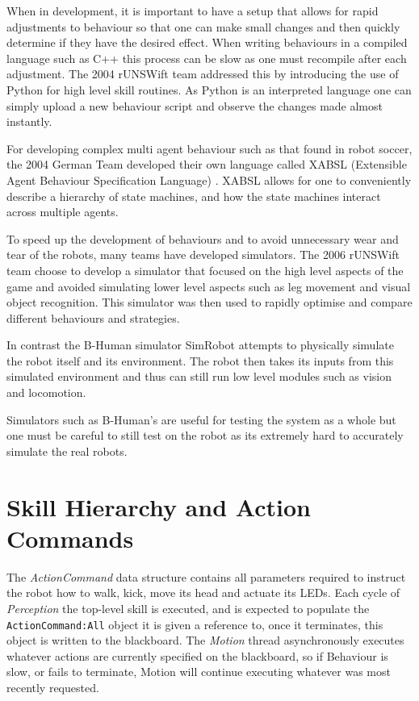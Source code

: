 \documentclass[pdftex,11pt,a4paper]{report}
\begin{document}
When in development, it is important to have a setup that allows for rapid adjustments to behaviour so that one can make small changes and then quickly determine if they have the desired effect. When writing behaviours in a compiled language such as C++ this process can be slow as one must recompile after each adjustment. The 2004 rUNSWift team addressed this by introducing the use of Python for high level skill routines. As Python is an interpreted language one can simply upload a new behaviour script and observe the changes made almost instantly.

For developing complex multi agent behaviour such as that found in robot soccer, the 2004 German Team developed their own language called XABSL (Extensible Agent Behaviour Specification Language) \cite{loetzsch04xabsl}. XABSL allows for one to conveniently describe a hierarchy of state machines, and how the state machines interact across multiple agents.

To speed up the development of behaviours and to avoid unnecessary wear and tear of the robots, many teams have developed simulators. The 2006 rUNSWift team \cite{huangthesis} choose to develop a simulator that focused on the high level aspects of the game and avoided simulating lower level aspects such as leg movement and visual object recognition. This simulator was then used to rapidly optimise and compare different behaviours and strategies. 

In contrast the B-Human simulator SimRobot \cite{thomas09code} attempts to physically simulate the robot itself and its environment. The robot then takes its inputs from this simulated environment and thus can still run low level modules such as vision and locomotion. 

Simulators such as B-Human's are useful for testing the system as a whole but one must be careful to still test on the robot as its extremely hard to accurately simulate the real robots.


\section{Skill Hierarchy and Action Commands}

   The \emph{ActionCommand} data structure contains all parameters required to instruct the robot how to walk, kick, move its head and actuate its LEDs. Each cycle of \emph{Perception} the top-level skill is executed, and is expected to populate the \texttt{ActionCommand:All} object it is given a reference to, once it terminates, this object is written to the blackboard. The \emph{Motion} thread asynchronously executes whatever actions are currently specified on the blackboard, so if Behaviour is slow, or fails to terminate, Motion will continue executing whatever was most recently requested.
\end{document}
